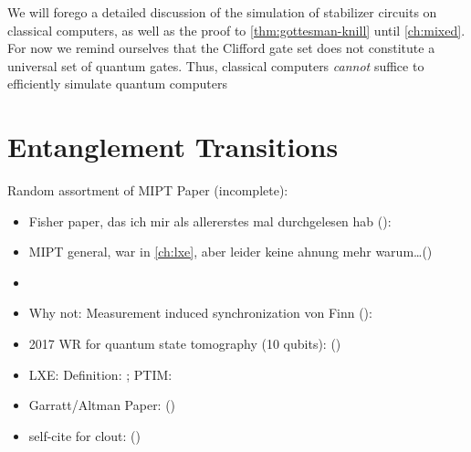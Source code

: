 We will forego a detailed discussion of the simulation of stabilizer circuits
on classical computers, as well as the proof to \cref{thm:gottesman-knill}
until \cref{ch:mixed}. For now we remind ourselves that the Clifford gate set
does not constitute a universal set of quantum gates. Thus, classical computers
\emph{cannot} suffice to efficiently simulate quantum computers
\clearpage
\section{Entanglement Transitions}\label{sec:ent-trans}


Random assortment of MIPT Paper (incomplete):

\begin{itemize}
  \item Fisher paper, das ich mir als allererstes mal durchgelesen hab
    ():
    \cite{liMeasurementdrivenEntanglementTransition2019}
  \item MIPT general, war in \cref{ch:lxe}, aber leider keine ahnung mehr
    warum\ldots () \cite{baoTheoryPhaseTransition2020}
  \item {}
    \cite{baoSymmetryEnrichedPhases2021}
  \item Why not: Measurement induced synchronization von Finn
    ():
    \cite{schmolkeMeasurementinducedQuantumSynchronization2023}
  \item 2017 WR for quantum state tomography (10 qubits):
    ()
    \cite{song10QubitEntanglementParallel2017}
  \item LXE: Definition: \cite{liCrossEntropyBenchmark2023}; PTIM:
    \cite{tikhanovskayaUniversalityCrossEntropy2023}
  \item Garratt/Altman Paper:
    () \cite{garrattProbingPostmeasurementEntanglement2023}
  \item self-cite for clout:
    ()
    \cite{schmolkeBoostingInformationTransfer2024}
\end{itemize}

